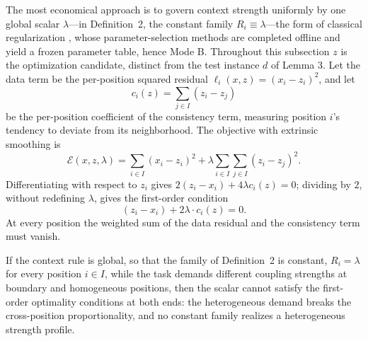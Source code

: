\documentclass[twoside,11pt]{article}
\begin{document}
The most economical approach is to govern context strength uniformly by one global scalar $\lambda$---in Definition~2, the constant family $R_i \equiv \lambda$---the form of classical regularization \citep{poggio1985}, whose parameter-selection methods are completed offline and yield a frozen parameter table, hence Mode B. Throughout this subsection $z$ is the optimization candidate, distinct from the test instance $d$ of Lemma 3. Let the data term be the per-position squared residual $\ell_i(x,z) = (x_i - z_i)^2$, and let
\begin{equation}
c_i (z) = \sum_{j \in I} (z_i - z_j)
\label{eq:kappa}%
\end{equation}%
be the per-position coefficient of the consistency term, measuring position $i$'s tendency to deviate from its neighborhood. The objective with extrinsic smoothing is
\begin{equation}
\mathcal{E}(x, z, \lambda) = \sum_{i \in I} (x_i - z_i)^2 + \lambda \sum_{i \in I} \sum_{j \in I} (z_i - z_j)^2 .
\label{eq:paradigmE}%
\end{equation}%
Differentiating with respect to $z_i$ gives $2(z_i-x_i)+4\lambda c_i(z)=0$; dividing by $2$, without redefining $\lambda$, gives the first-order condition
\begin{equation}
(z_i - x_i) + 2\lambda \cdot c_i (z) = 0 .
\label{eq:foc}%
\end{equation}%
At every position the weighted sum of the data residual and the consistency term must vanish.

\begin{lemma}
If the context rule is global, so that the family of Definition~2 is constant, $R_i = \lambda$ for every position $i \in I$, while the task demands different coupling strengths at boundary and homogeneous positions, then the scalar cannot satisfy the first-order optimality conditions at both ends: the heterogeneous demand breaks the cross-position proportionality, and no constant family realizes a heterogeneous strength profile.
\end{lemma}
\end{document}
